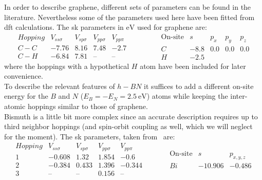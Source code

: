 %
%
In order to describe graphene, different sets of parameters can be found in the literature\cite{}. Nevertheless some of the parameters used here have been fitted from \ac{dft} calculations. The \ac{sk} parameters in $\si{\eV}$ used for graphene are:
\begin{equation}
  \begin{array}{l|cccc}
    Hopping & V_{ss\sigma} & V_{sp\sigma} & V_{pp\sigma} & V_{pp\pi} \\ \hline
    C-C & -7.76 & 8.16 & 7.48 & -2.7 \\
    C-H & -6.84 & 7.81 & \text{--} & \text{--}
  \end{array}\qquad\qquad
  \begin{array}{c|cccc}
    \text{On-site} & s & p_x & p_y & p_z \\ \hline
    C & -8.8 & 0.0 & 0.0 & 0.0 \\
    H & -2.5 &     &     &
  \end{array}
\label{G_SK_params}
\end{equation}
where the hoppings with a hypothetical $H$ atom have been included for later convenience.\\

To describe the relevant features of $h-BN$ it suffices to add a different on-site energy for the $B$ and $N$ ($E_{B} = -E_{N} =\SI{2.5}{\eV}$) atoms while keeping the inter-atomic hoppings similar to those of graphene.\\

Bismuth is a little bit more complex since an accurate description requires up to third neighbor hoppings (and spin-orbit coupling as well, which we will neglect for the moment). The \ac{sk} parameters, taken from~ are:
\begin{equation}
  \begin{array}{c|cccc}
    Hopping & V_{ss\sigma} & V_{sp\sigma} & V_{pp\sigma} & V_{pp\pi} \\ \hline
    1 & -0.608 & 1.32 & 1.854 & -0.6 \\
    2 & -0.384 & 0.433 & 1.396 & -0.344 \\
    3 & \text{--} & \text{--} & 0.156 & \text{--}
  \end{array}\quad\qquad
  \begin{array}{c|cc}
     \text{On-site} & s & p_{x,y,z} \\ \hline
    Bi & -10.906 & -0.486
  \end{array}
\label{Bi_SK_params}
\end{equation}\\

